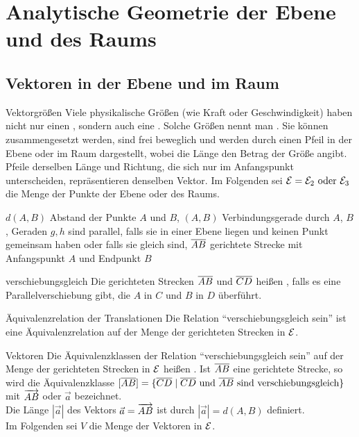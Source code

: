 \chapter{%
    Analytische Geometrie der Ebene und des Raums%
}

\section{%
    Vektoren in der Ebene und im Raum%
}

\begin{Def}{Vektorgrößen}
    Viele physikalische Größen (wie Kraft oder Geschwindigkeit) haben nicht nur
    einen , sondern auch eine .
    Solche Größen nennt man .
    Sie können zusammengesetzt werden, sind frei beweglich und werden durch
    einen Pfeil in der Ebene oder im Raum dargestellt, wobei die Länge
    den Betrag der Größe angibt.
    Pfeile derselben Länge und Richtung, die sich nur im Anfangspunkt
    unterscheiden, repräsentieren denselben Vektor.
    Im Folgenden sei $\mathcal{E} = \mathcal{E}_2 \text{ oder } \mathcal{E}_3$
    die Menge der Punkte der Ebene oder des Raums.
\end{Def}

\begin{Notation}
    $d(A, B)$ Abstand der Punkte $A$ und $B$, \qquad
    $(A, B)$ Verbindungsgerade durch $A$, $B$, \qquad
    Geraden $g, h$ sind parallel, falls sie in einer Ebene liegen und keinen
    Punkt gemeinsam haben oder falls sie gleich sind, \qquad
    $\overline{AB}$ gerichtete Strecke mit Anfangspunkt $A$ und Endpunkt $B$
\end{Notation}

\begin{Def}{verschiebungsgleich}
    Die gerichteten Strecken $\overline{AB}$ und $\overline{CD}$ heißen
    , falls es eine Parallelverschiebung gibt,
    die $A$ in $C$ und $B$ in $D$ überführt.
\end{Def}

\begin{Lemma}{Äquivalenzrelation der Translationen}
    Die Relation "`verschiebungsgleich sein"' ist eine Äquivalenzrelation
    auf der Menge der gerichteten Strecken in $\mathcal{E}$.
\end{Lemma}

\begin{Def}{Vektoren}
    Die Äquivalenzklassen der Relation "`verschiebungsgleich sein"'
    auf der Menge der gerichteten Strecken in $\mathcal{E}$ heißen
    .
    Ist $\overline{AB}$ eine gerichtete Strecke, so wird die Äquivalenzklasse
    $[\overline{AB}] = \{\overline{CD} \;|\; \overline{CD} \text{ und }
    \overline{ AB } \text{ sind verschiebungsgleich}\}$ mit $\overrightarrow{AB}$
    oder $\vec{a}$ bezeichnet. \\
    Die Länge $|\vec{a}|$ des Vektors $\vec{a} = \overrightarrow{AB}$ ist durch
    $|\vec{a}| = d(A, B)$ definiert. \\
    Im Folgenden sei $V$ die Menge der Vektoren in $\mathcal{E}$.
\end{Def}

